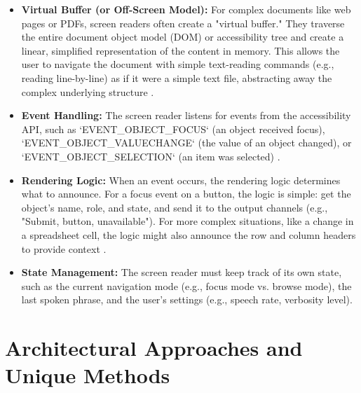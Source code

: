 \begin{itemize}
	\item \textbf{Virtual Buffer (or Off-Screen Model):} For complex documents like web pages or PDFs, screen readers often create a "virtual buffer." They traverse the entire document object model (DOM) or accessibility tree and create a linear, simplified representation of the content in memory. This allows the user to navigate the document with simple text-reading commands (e.g., reading line-by-line) as if it were a simple text file, abstracting away the complex underlying structure \cite{kingsbury2025, WSRPrimerCoverage}.
	\item \textbf{Event Handling:} The screen reader listens for events from the accessibility API, such as `EVENT\_OBJECT\_FOCUS` (an object received focus), `EVENT\_OBJECT\_VALUECHANGE` (the value of an object changed), or `EVENT\_OBJECT\_SELECTION` (an item was selected) \cite{UIAutomationOverview}.
	\item \textbf{Rendering Logic:} When an event occurs, the rendering logic determines what to announce. For a focus event on a button, the logic is simple: get the object's name, role, and state, and send it to the output channels (e.g., "Submit, button, unavailable"). For more complex situations, like a change in a spreadsheet cell, the logic might also announce the row and column headers to provide context \cite{Leporini2004}.
	\item \textbf{State Management:} The screen reader must keep track of its own state, such as the current navigation mode (e.g., focus mode vs. browse mode), the last spoken phrase, and the user's settings (e.g., speech rate, verbosity level).
\end{itemize}

\section{Architectural Approaches and Unique Methods}
\label{sec:architectural-approaches-and-unique-methods}

